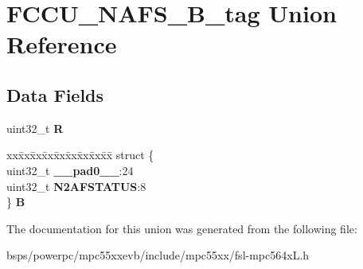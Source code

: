 \hypertarget{unionFCCU__NAFS__32B__tag}{}\section{F\+C\+C\+U\+\_\+\+N\+A\+F\+S\+\_\+B\+\_\+tag Union Reference}
\label{unionFCCU__NAFS__32B__tag}
\subsection*{Data Fields}
\begin{DoxyCompactItemize}
\item 
\mbox{\label{unionFCCU__NAFS__32B__tag_a1d4b9fe921e57b896b17818a55449456}} 
uint32\+\_\+t {\bfseries R}
\item 
\mbox{\label{unionFCCU__NAFS__32B__tag_a9b2f96e0255ad628fb52e50afd11238c}} 
\begin{tabbing}
xx\=xx\=xx\=xx\=xx\=xx\=xx\=xx\=xx\=\kill
struct \{\\
\>uint32\_t {\bfseries \_\_pad0\_\_}:24\\
\>uint32\_t {\bfseries N2AFSTATUS}:8\\
\} {\bfseries B}\\

\end{tabbing}\end{DoxyCompactItemize}


The documentation for this union was generated from the following file\+:\begin{DoxyCompactItemize}
\item 
bsps/powerpc/mpc55xxevb/include/mpc55xx/fsl-\/mpc564x\+L.\+h\end{DoxyCompactItemize}
